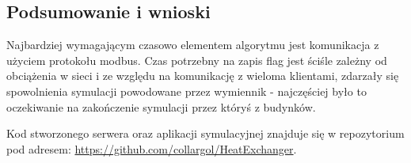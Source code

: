     \subsection{Podsumowanie i wnioski}
    Najbardziej wymagającym czasowo elementem algorytmu jest komunikacja z użyciem protokołu modbus. Czas potrzebny na zapis flag jest ściśle zależny od obciążenia w sieci i ze względu na komunikację z wieloma klientami, zdarzały się spowolnienia symulacji powodowane przez wymiennik - najczęściej było to oczekiwanie na zakończenie symulacji przez któryś z budynków. 
    
    Kod stworzonego serwera oraz aplikacji symulacyjnej znajduje się w repozytorium pod adresem: \url{https://github.com/collargol/HeatExchanger}.
